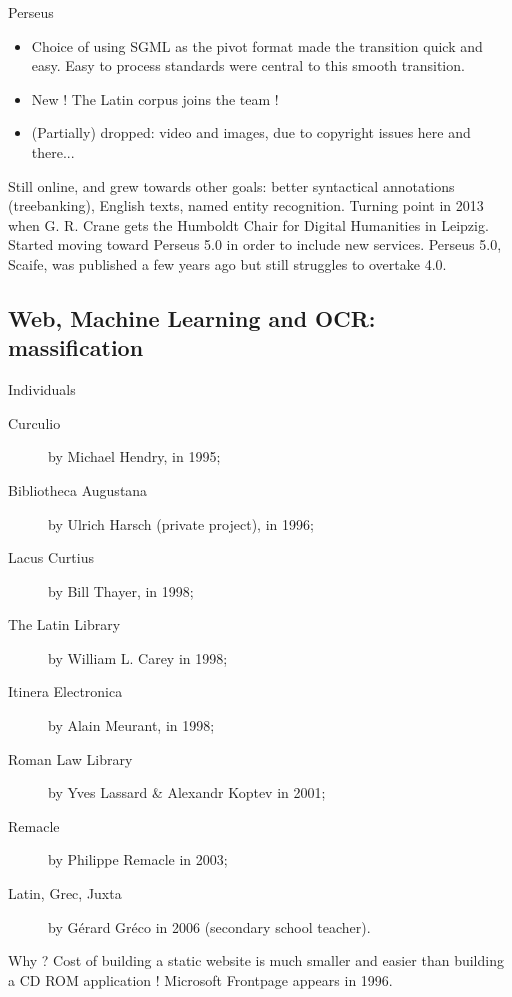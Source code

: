 \documentclass[aspectratio=169]{beamer}
\begin{document}
\begin{frame}{Perseus}
    \begin{itemize}
        \item Choice of using SGML as the pivot format made the transition quick and easy. Easy to process standards were central to this smooth transition. 
        \item New ! The Latin corpus joins the team !
        \item (Partially) dropped: video and images, due to copyright issues here and there...
    \end{itemize}
    Still online, and grew towards other goals: better syntactical annotations (treebanking), English texts, named entity recognition. Turning point in 2013 when G. R. Crane gets the Humboldt Chair for Digital Humanities in Leipzig. Started moving toward Perseus 5.0 in order to include new services. Perseus 5.0, Scaife, was published a few years ago but still struggles to overtake 4.0.
\end{frame}

\subsection{Web, Machine Learning and OCR: massification}

\begin{frame}{Individuals}


\begin{description}
    \item[Curculio] by Michael Hendry, in 1995;
    \item[Bibliotheca Augustana] by Ulrich Harsch (private project), in 1996;
    \item[Lacus Curtius] by Bill Thayer, in 1998;
    \item[The Latin Library] by William L. Carey in 1998;
    \item[Itinera Electronica] by Alain Meurant, in 1998;
    \item[Roman Law Library] by Yves Lassard \& Alexandr Koptev in 2001; 
    \item[Remacle] by Philippe Remacle in 2003;
    \item[Latin, Grec, Juxta] by Gérard Gréco in 2006 (secondary school teacher). 
\end{description}

Why ? Cost of building a static website is much smaller and easier than building a CD ROM application ! Microsoft Frontpage appears in 1996.
    
\end{frame}
\end{document}
